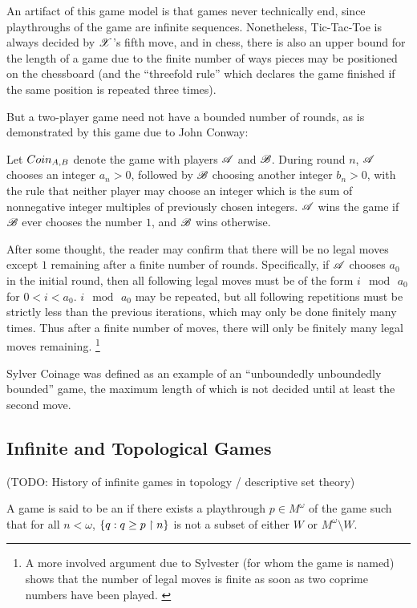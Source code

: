 An artifact of this game model is that games never technically end, since 
playthroughs of the game are infinite sequences. Nonetheless, Tic-Tac-Toe
is always decided by $\mathscr{X}$'s fifth move, and in chess, there is also an
upper bound for the length of a game due to the finite number of ways pieces
may be positioned on the chessboard (and the ``threefold rule''
which declares the game finished if the same position is repeated three times).

But a two-player game need not have a bounded number of rounds, as is
demonstrated by this game due to John Conway:
\cite{winning_ways}

\begin{game}
  Let ${Coin}_{A,B}$ denote the game  with players 
  $\mathscr{A}$ and $\mathscr{B}$. During round $n$, $\mathscr{A}$ chooses an integer $a_n>0$,
  followed by $\mathscr{B}$ choosing another integer $b_n>0$, with the rule that
  neither player may choose an integer which is the sum of nonnegative integer 
  multiples of previously chosen integers. $\mathscr{A}$ wins the game if $\mathscr{B}$
  ever chooses the number $1$, and $\mathscr{B}$ wins otherwise.
\end{game}

After some thought, the reader may confirm that there will be no 
legal moves except $1$ remaining after a finite number of rounds. 
Specifically, if $\mathscr{A}$
chooses $a_0$ in the initial round, then all following legal moves must be
of the form $i \mod\, a_0$ for $0<i<a_0$. $i \mod\, a_0$ may be repeated,
but all following repetitions must be strictly less than the previous
iterations, which may only be done finitely many times. Thus after a finite 
number of moves, there will only be finitely many legal moves remaining. 
\footnote{
  A more involved
  argument due to Sylvester (for whom the game is named)
  shows that the number of legal moves 
  is finite as soon as two coprime numbers have been played. \cite{sylvester}
}

Sylver Coinage was defined as an example of an ``unboundedly unboundedly 
bounded'' game, the maximum length of which is not decided until at least
the second move.


\subsection{Infinite and Topological Games}

(TODO: History of infinite games in topology / descriptive set theory)

\begin{defn}
  A game is said to be an  if there exists a playthrough
  $p\in M^\omega$ of the game such that for all $n<\omega$,
    $ 
      \{q : q\geq p\restriction n \}
    $
  is not a subset of either $W$ or $M^\omega\setminus W$.
\end{defn}

